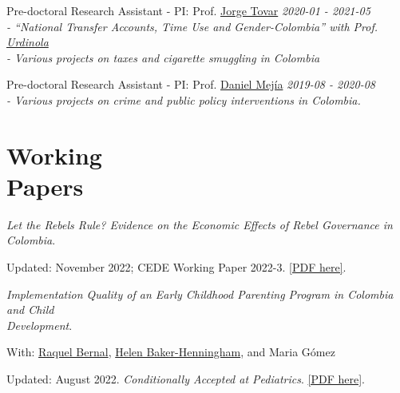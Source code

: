 \documentclass[margin,line]{res}
\newenvironment{list1}{
  \begin{list}{\ding{113}}{%
      \setlength{\itemsep}{0in}
      \setlength{\parsep}{0in} \setlength{\parskip}{0in}
      \setlength{\topsep}{0in} \setlength{\partopsep}{0in} 
      \setlength{\leftmargin}{0.17in}}}{\end{list}}
\begin{document}
\begin{resume}
\vspace{-.4cm}

{Pre-doctoral Research Assistant - PI: Prof. \href{https://sites.google.com/view/jorgetovar/home}{Jorge Tovar}} \hfill \emph{2020-01 - 2021-05} \\
{\em \footnotesize - ``National Transfer Accounts, Time Use and Gender-Colombia''  %
	with  Prof. \href{https://sites.google.com/site/piedadurdinola/}{Urdinola}}  \\
{\em \footnotesize - Various projects on taxes and cigarette smuggling in Colombia} 

\vspace{-.1cm}
{Pre-doctoral Research Assistant - PI: Prof. \href{https://sites.google.com/view/danielmejial}{Daniel Mejía}} \hfill \emph{2019-08 - 2020-08} \\
{\em \footnotesize - Various projects on crime and public policy interventions in Colombia.} 





\vspace{.1cm}

\section{\sc Working \\ Papers}

\textit{Let the Rebels Rule? Evidence on the Economic Effects of Rebel Governance in Colombia}.
\begin{list1}
    \item[] Updated: November 2022; CEDE Working Paper 2022-3. \href{https://santiago-perezc.github.io/documents/masters-thesis.pdf}{[PDF here]}. 
\end{list1}


\textit{Implementation Quality of an Early Childhood Parenting Program in Colombia and Child \\ Development}.  
\begin{list1}
    \item[] With: \href{https://sites.google.com/view/raquelbernal}{Raquel Bernal}, \href{https://research.bangor.ac.uk/portal/en/researchers/helen-henningham(ab5999a9-22af-4394-b4f4-89dff9971ad1).html}{Helen Baker-Henningham}, and Maria Gómez  
    \item[] Updated: August 2022. \emph{Conditionally Accepted at Pediatrics}. \href{https://santiago-perezc.github.io/documents/Pediatrics_Submitted.pdf}{[PDF here]}.
\end{list1}



\end{resume}
\end{document}
